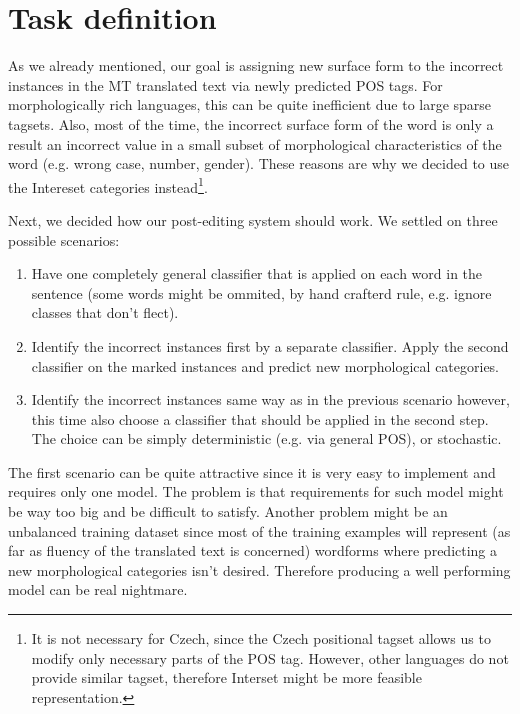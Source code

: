 \section{Task definition}

As we already mentioned, our goal is assigning new surface form to the incorrect instances
in the MT translated text via newly predicted POS tags. For morphologically rich languages,
this can be quite inefficient due to large sparse tagsets. Also, most of the time,
the incorrect surface form of the word is only a result an incorrect value in a small
subset of morphological characteristics of the word (e.g. wrong case, number, gender).
These reasons are why we decided to use the Intereset categories instead\footnote{It is
not necessary for Czech, since the Czech positional tagset allows us to modify only necessary
parts of the POS tag. However, other languages do not provide similar tagset, therefore
Interset might be more feasible representation.}.

Next, we decided how our post-editing system should work. We settled on three possible scenarios:
\begin{enumerate}
    \item Have one completely general classifier that is applied on each word in the sentence (some
        words might be ommited, by hand crafterd rule, e.g. ignore classes that don't flect).
    \item Identify the incorrect instances first by a separate classifier. Apply the second classifier
        on the marked instances and predict new morphological categories.
    \item Identify the incorrect instances same way as in the previous scenario however, this time also choose a classifier that
        should be applied in the second step. The choice can be simply deterministic (e.g. via general POS), or stochastic.
\end{enumerate}

The first scenario can be quite attractive since it is very easy to implement and requires only one model.
The problem is that requirements for such model might be way too big and be difficult to satisfy. Another
problem might be an unbalanced training dataset since most of the training examples will represent
 (as far as fluency of the translated text is concerned)
wordforms where predicting a new morphological categories isn't desired. Therefore
producing a well performing model can be real nightmare.

